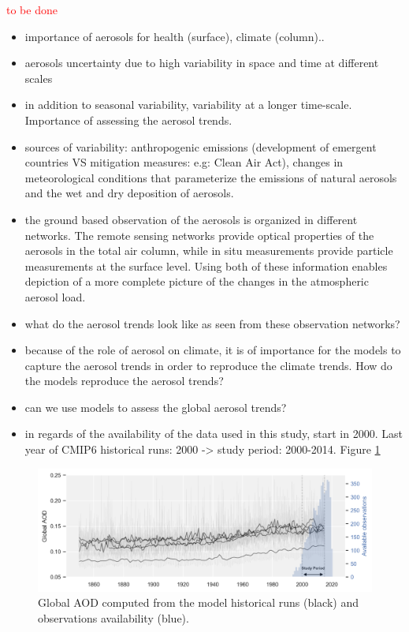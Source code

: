 \documentclass[journal abbreviation, manuscript]{copernicus}
\begin{document}
\introduction  %
\textcolor{red}{to be done}
\begin{itemize}
 \item importance of aerosols for health (surface), climate (column)..
 \item aerosols uncertainty due to high variability in space and time at different scales
 \item in addition to seasonal variability, variability at a longer time-scale. Importance of assessing the aerosol trends.
 \item sources of variability: anthropogenic emissions (development of emergent countries VS mitigation measures: e.g: Clean Air Act), changes in meteorological conditions that parameterize the emissions of natural aerosols and the wet and dry deposition of aerosols.
 \item the ground based observation of the aerosols is organized in different networks. The remote sensing networks provide optical properties of the aerosols in the total air column, while in situ measurements provide particle measurements at the surface level. Using both of these information enables depiction of a more complete picture of the changes in the atmospheric aerosol load.
 \item what do the aerosol trends look like as seen from these observation networks?
 \item because of the role of aerosol on climate, it is of importance for the models to capture the aerosol trends in order to reproduce the climate trends. How do the models reproduce the aerosol trends?
 \item can we use models to assess the global aerosol trends?
 \item in regards of the availability of the data used in this study, start in 2000. Last year of CMIP6 historical runs: 2000 -> study period: 2000-2014. Figure \ref{fig:hist_runs}
\end{itemize}

\begin{figure}
 \centering
 \includegraphics[width=12cm]{../scripts/figs/hist_runs.png}
 \caption{Global AOD computed from the model historical runs (black) and observations availability (blue).}
 \label{fig:hist_runs}
\end{figure}
\end{document}
